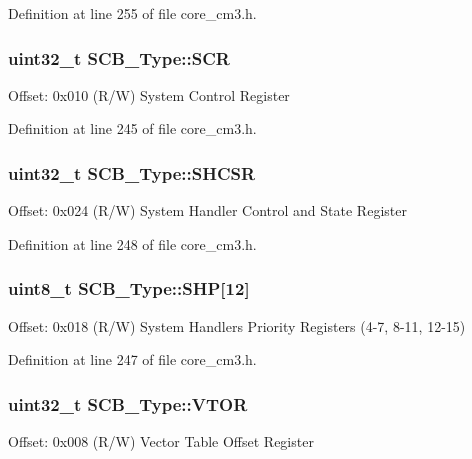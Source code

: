 \-Definition at line 255 of file core\-\_\-cm3.\-h.

\hypertarget{struct_s_c_b___type_abfad14e7b4534d73d329819625d77a16}{
\subsubsection[{\-S\-C\-R}]{ uint32\-\_\-t {\bf \-S\-C\-B\-\_\-\-Type\-::\-S\-C\-R}}}\label{struct_s_c_b___type_abfad14e7b4534d73d329819625d77a16}
\-Offset\-: 0x010 (\-R/\-W) \-System \-Control \-Register 

\-Definition at line 245 of file core\-\_\-cm3.\-h.

\hypertarget{struct_s_c_b___type_ae9891a59abbe51b0b2067ca507ca212f}{
\subsubsection[{\-S\-H\-C\-S\-R}]{ uint32\-\_\-t {\bf \-S\-C\-B\-\_\-\-Type\-::\-S\-H\-C\-S\-R}}}\label{struct_s_c_b___type_ae9891a59abbe51b0b2067ca507ca212f}
\-Offset\-: 0x024 (\-R/\-W) \-System \-Handler \-Control and \-State \-Register 

\-Definition at line 248 of file core\-\_\-cm3.\-h.

\hypertarget{struct_s_c_b___type_af6336103f8be0cab29de51daed5a65f4}{
\subsubsection[{\-S\-H\-P}]{ uint8\-\_\-t {\bf \-S\-C\-B\-\_\-\-Type\-::\-S\-H\-P}\mbox{[}12\mbox{]}}}\label{struct_s_c_b___type_af6336103f8be0cab29de51daed5a65f4}
\-Offset\-: 0x018 (\-R/\-W) \-System \-Handlers \-Priority \-Registers (4-\/7, 8-\/11, 12-\/15) 

\-Definition at line 247 of file core\-\_\-cm3.\-h.

\hypertarget{struct_s_c_b___type_a0faf96f964931cadfb71cfa54e051f6f}{
\subsubsection[{\-V\-T\-O\-R}]{ uint32\-\_\-t {\bf \-S\-C\-B\-\_\-\-Type\-::\-V\-T\-O\-R}}}\label{struct_s_c_b___type_a0faf96f964931cadfb71cfa54e051f6f}
\-Offset\-: 0x008 (\-R/\-W) \-Vector \-Table \-Offset \-Register 

